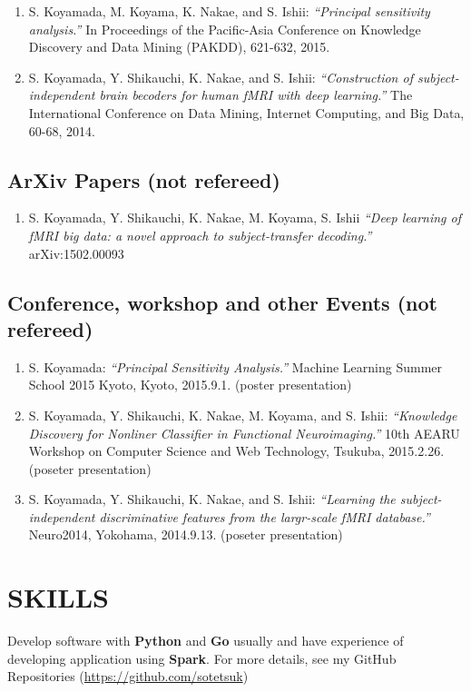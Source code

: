 \documentclass[paper=a4,fontsize=11pt]{scrartcl} %
\newcommand{\sepspace}{\vspace*{1em}}		%
\newcommand{\NewPart}[1]{\section*{\uppercase{#1}}}
\begin{document}
\begin{enumerate}
 \item S. Koyamada, M. Koyama, K. Nakae, and S. Ishii: {\em ``Principal sensitivity analysis.''} In Proceedings of the Pacific-Asia Conference on Knowledge Discovery and Data Mining (PAKDD), 621-632, 2015.
 \item S. Koyamada, Y. Shikauchi, K. Nakae, and S. Ishii: {\em ``Construction of subject-independent brain becoders for human fMRI with deep learning.''} The International Conference on Data Mining, Internet Computing, and Big Data, 60-68, 2014.
\end{enumerate}

\subsection*{ArXiv Papers (not refereed)}
\begin{enumerate}
\item S. Koyamada, Y. Shikauchi, K. Nakae, M. Koyama, S. Ishii {\em ``Deep learning of fMRI big data: a novel approach to subject-transfer decoding.''} arXiv:1502.00093
\end{enumerate}

\subsection*{Conference, workshop and other Events (not refereed)}

\begin{enumerate}
 \item S. Koyamada: {\em ``Principal Sensitivity Analysis.''} Machine Learning Summer School 2015 Kyoto, Kyoto, 2015.9.1. (poster presentation)
 \item S. Koyamada, Y. Shikauchi, K. Nakae, M. Koyama, and S. Ishii: {\em ``Knowledge Discovery for Nonliner Classifier in Functional Neuroimaging.''} 10th AEARU Workshop on Computer Science and Web Technology, Tsukuba, 2015.2.26. (poseter presentation)
 \item S. Koyamada, Y. Shikauchi, K. Nakae, and S. Ishii: {\em ``Learning the subject-independent discriminative features from the largr-scale fMRI database.''} Neuro2014, Yokohama, 2014.9.13. (poseter presentation)
\end{enumerate}

\NewPart{Skills}{}
Develop software with {\bf Python} and {\bf Go} usually and have experience of developing application using {\bf Spark}.
For more details, see my GitHub Repositories (\url{https://github.com/sotetsuk})
\sepspace
\end{document}

